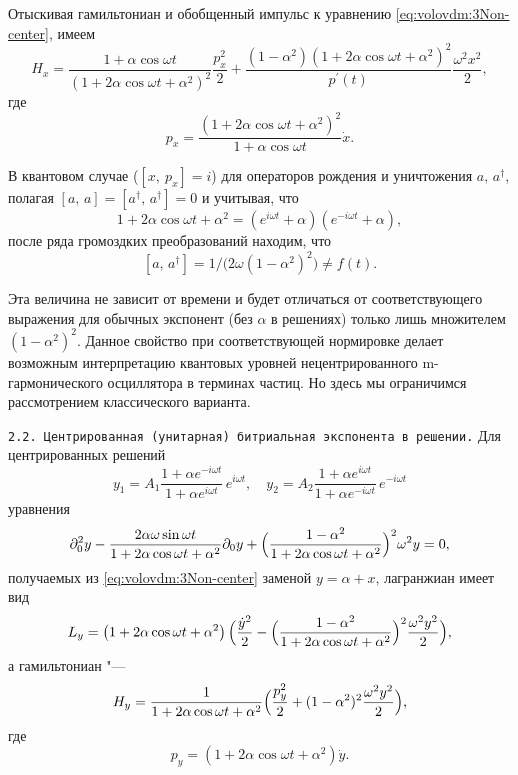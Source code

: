 Отыскивая гамильтониан и обобщенный импульс к уравнению \eqref{eq:volovdm:3Non-center},
имеем
\begin{equation}
H_{x}=\dfrac{1+\alpha\cos\omega t}{\left(1+2\alpha\cos\omega t+\alpha^{2}\right)^{2}}\frac{p_{x}^{2}}{2}+\frac{\left(1-\alpha^{2}\right)\left(1+2\alpha\cos\omega t+\alpha^{2}\right)^{2}}{p^{\prime}(t)}\frac{\omega^{2}x^{2}}{2},\label{eq:volovdm:Hx}
\end{equation}
где
\[
p_{x}=\dfrac{\left(1+2\alpha\cos\omega t+\alpha^{2}\right)^{2}}{1+\alpha\cos\omega t}\dot{x}.
\]

В квантовом случае ($\left[x,\: p_{x}\right]=i$) для операторов рождения
и уничтожения $a,\, a^{\dagger}$, полагая $\left[a,\, a\right]=\left[a^{\dagger},\, a^{\dagger}\right]=0$
и учитывая, что
\[
1+2\alpha\cos\omega t+\alpha^{2}=\left(e^{i\omega t}+\alpha\right)\left(e^{-i\omega t}+\alpha\right),
\]
после ряда громоздких преобразований находим, что
\[
\left[a,\, a^{\dagger}\right]=1/\bigl(2\omega\left(1-\alpha^{2}\right)^{2}\bigr)\neq f(t).
\]


Эта величина не зависит от времени и будет отличаться от соответствующего
выражения для обычных экспонент (без $\alpha$ в решениях) только
лишь множителем $\left(1-\alpha^{2}\right)^{2}$. Данное свойство
при соответствующей нормировке делает возможным интерпретацию квантовых
уровней нецентрированного m-гармонического осциллятора в терминах
частиц. Но здесь мы ограничимся рассмотрением классического варианта.

\smallskip

\texttt{2.2. Центрированная (унитарная) битриальная экспонента в решении.}
Для центрированных решений
\begin{equation}
y_{1}=A_{1}\dfrac{1+\alpha e^{-i\omega t}}{1+\alpha e^{i\omega t}}\, e^{i\omega t}, \quad  y_{2}=A_{2}\dfrac{1+\alpha e^{i\omega t}}{1+\alpha e^{-i\omega t}}\, e^{-i\omega t}\label{eq:volovdm:mexp}
\end{equation}
 уравнения
\begin{equation}
\partial_{0}^{2}y-\dfrac{2\alpha\omega\sin\omega t}{1+2\alpha\cos\omega t+\alpha^{2}} \partial_{0}y+
\Bigl(\dfrac{1-\alpha^{2}}{1+2\alpha\cos\omega t+\alpha^{2}}\Bigr)^{2}\omega^{2}y =0,\label{eq:volovdm:m-eq}
\end{equation}
получаемых из \eqref{eq:volovdm:3Non-center} заменой $y=\alpha+x$, 
лагранжиан имеет вид
\begin{equation}
L_{y}=\left(1+2\alpha\cos\omega t+\alpha^{2}\right)
\Bigl(\frac{\dot{y}^{2}}{2}-\Bigl(\dfrac{1-\alpha^{2}}{1+2\alpha\cos\omega t+\alpha^{2}}\Bigr)^{2}\frac{\omega^{2}y^{2}}{2}\Bigr),\label{eq:volovdm:Ly}
\end{equation}
а гамильтониан "---
\begin{equation}
H_{y}=\dfrac{1}{1+2\alpha\cos\omega t+\alpha^{2}}\Bigl(\frac{p_{y}^{2}}{2}+(1-\alpha^{2})^{2}\frac{\omega^{2}y^{2}}{2}\Bigr),\label{eq:volovdm:Hy}
\end{equation}
где
\[
p_{y}=\left(1+2\alpha\cos\omega t+\alpha^{2}\right)\dot{y}.
\]


